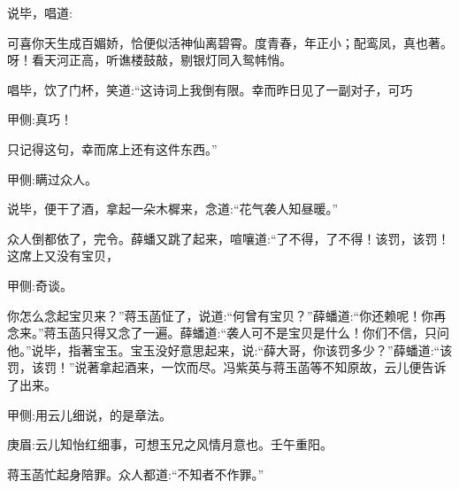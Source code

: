 \begin{parag}
    说毕，唱道:
\end{parag}

\begin{qute2sp}
    \begin{poem}
        \begin{pl}可喜你天生成百媚娇，恰便似活神仙离碧霄。度青春，年正小；配鸾凤，真也著。呀！看天河正高，听谯楼鼓敲，剔银灯同入鸳帏悄。\end{pl}
    \end{poem}
\end{qute2sp}


\begin{parag}
    唱毕，饮了门杯，笑道:“这诗词上我倒有限。幸而昨日见了一副对子，可巧\begin{note}甲侧:真巧！\end{note}只记得这句，幸而席上还有这件东西。”\begin{note}甲侧:瞒过众人。\end{note}说毕，便干了酒，拿起一朵木樨来，念道:“花气袭人知昼暖。”
\end{parag}


\begin{parag}
    众人倒都依了，完令。薛蟠又跳了起来，喧嚷道:“了不得，了不得！该罚，该罚！这席上又没有宝贝，\begin{note}甲侧:奇谈。\end{note}你怎么念起宝贝来？”蒋玉菡怔了，说道:“何曾有宝贝？”薛蟠道:“你还赖呢！你再念来。”蒋玉菡只得又念了一遍。薛蟠道:“袭人可不是宝贝是什么！你们不信，只问他。”说毕，指著宝玉。宝玉没好意思起来，说:“薛大哥，你该罚多少？”薛蟠道:“该罚，该罚！”说著拿起酒来，一饮而尽。冯紫英与蒋玉菡等不知原故，云儿便告诉了出来。\begin{note}甲侧:用云儿细说，的是章法。\end{note}\begin{note}庚眉:云儿知怡红细事，可想玉兄之风情月意也。壬午重阳。\end{note}蒋玉菡忙起身陪罪。众人都道:“不知者不作罪。”
\end{parag}


